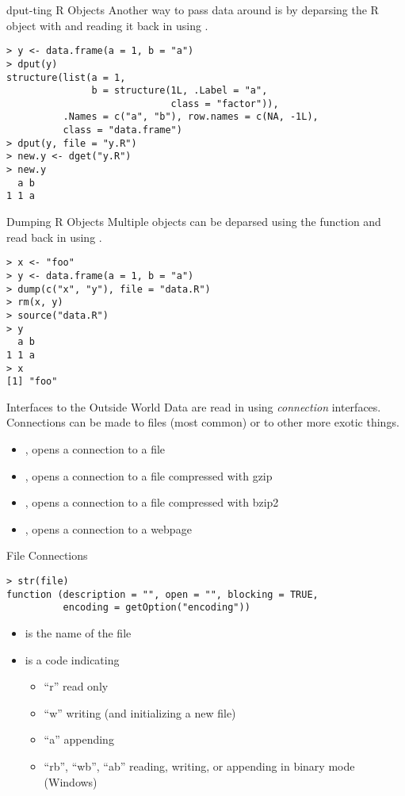 \documentclass[aspectratio=169]{beamer}
\begin{document}
\begin{frame}[fragile]{dput-ting R Objects}
Another way to pass data around is by deparsing the R object with
 and reading it back in using .
\begin{verbatim}
> y <- data.frame(a = 1, b = "a")
> dput(y)
structure(list(a = 1, 
               b = structure(1L, .Label = "a", 
                             class = "factor")), 
          .Names = c("a", "b"), row.names = c(NA, -1L), 
          class = "data.frame")
> dput(y, file = "y.R")
> new.y <- dget("y.R")
> new.y
  a b
1 1 a
\end{verbatim}
\end{frame}


\begin{frame}[fragile]{Dumping R Objects}
Multiple objects can be deparsed using the  function and
read back in using .
\begin{verbatim}
> x <- "foo"
> y <- data.frame(a = 1, b = "a")
> dump(c("x", "y"), file = "data.R")
> rm(x, y)
> source("data.R")
> y
  a b
1 1 a
> x
[1] "foo"
\end{verbatim}
\end{frame}



\begin{frame}{Interfaces to the Outside World}
Data are read in using \textit{connection} interfaces.  Connections
can be made to files (most common) or to other more exotic things.
\begin{itemize}
\item
{}, opens a connection to a file
\item
{}, opens a connection to a file compressed with gzip
\item
{}, opens a connection to a file compressed with bzip2
\item
{}, opens a connection to a webpage
\end{itemize}
\end{frame}


\begin{frame}[fragile]{File Connections}
\begin{verbatim}
> str(file)
function (description = "", open = "", blocking = TRUE, 
          encoding = getOption("encoding"))
\end{verbatim}
\begin{itemize}
\item
{} is the name of the file
\item
{} is a code indicating
\begin{itemize}
\item
``r'' read only
\item
``w'' writing (and initializing a new file)
\item
``a'' appending
\item
``rb'', ``wb'', ``ab'' reading, writing, or appending in binary mode
(Windows)
\end{itemize}
\end{itemize}
\end{frame}
\end{document}
